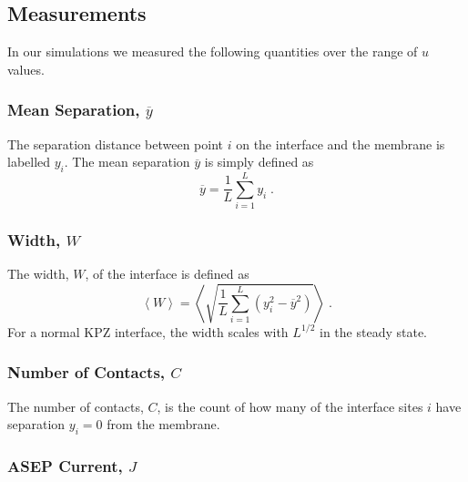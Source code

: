\documentclass[a4paper,10pt]{article}
\begin{document}
\subsection{Measurements}

In our simulations we measured the following quantities over the range of $u$ values.

\subsubsection*{Mean Separation, $\overline{y}$}

The separation distance between point $i$ on the interface and the membrane is labelled $y_i$. The mean separation $\overline{y}$  is simply defined as
\begin{equation}
  \overline{y} = \frac{1}{L} \sum_{i=1}^L y_i \;.
\end{equation}

\subsubsection*{Width, $W$}

The width, $W$, of the interface is defined as
\begin{equation}
 \left \langle W \right\rangle = \left \langle \sqrt{ \frac{1}{L} \sum_{i=1}^L \left( y_i^2 - \overline{y}^2 \right)  } \right\rangle \;.
\end{equation}
For a normal KPZ interface, the width scales with $L^{1/2}$ in the steady state. 

\subsubsection*{Number of Contacts, $C$}

The number of contacts, $C$, is the count of how many of the interface sites $i$ have separation $y_i=0$ from the membrane. 

\subsubsection*{ASEP Current, $J$}
\end{document}
